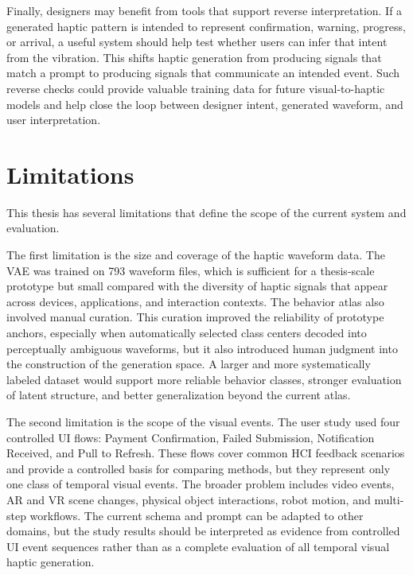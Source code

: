 Finally, designers may benefit from tools that support reverse interpretation. If a generated haptic pattern is intended to represent confirmation, warning, progress, or arrival, a useful system should help test whether users can infer that intent from the vibration. This shifts haptic generation from producing signals that match a prompt to producing signals that communicate an intended event. Such reverse checks could provide valuable training data for future visual-to-haptic models and help close the loop between designer intent, generated waveform, and user interpretation.

\section{Limitations}

This thesis has several limitations that define the scope of the current system and evaluation.

The first limitation is the size and coverage of the haptic waveform data. The VAE was trained on 793 waveform files, which is sufficient for a thesis-scale prototype but small compared with the diversity of haptic signals that appear across devices, applications, and interaction contexts. The behavior atlas also involved manual curation. This curation improved the reliability of prototype anchors, especially when automatically selected class centers decoded into perceptually ambiguous waveforms, but it also introduced human judgment into the construction of the generation space. A larger and more systematically labeled dataset would support more reliable behavior classes, stronger evaluation of latent structure, and better generalization beyond the current atlas.

The second limitation is the scope of the visual events. The user study used four controlled UI flows: Payment Confirmation, Failed Submission, Notification Received, and Pull to Refresh. These flows cover common HCI feedback scenarios and provide a controlled basis for comparing methods, but they represent only one class of temporal visual events. The broader problem includes video events, AR and VR scene changes, physical object interactions, robot motion, and multi-step workflows. The current schema and prompt can be adapted to other domains, but the study results should be interpreted as evidence from controlled UI event sequences rather than as a complete evaluation of all temporal visual haptic generation.

